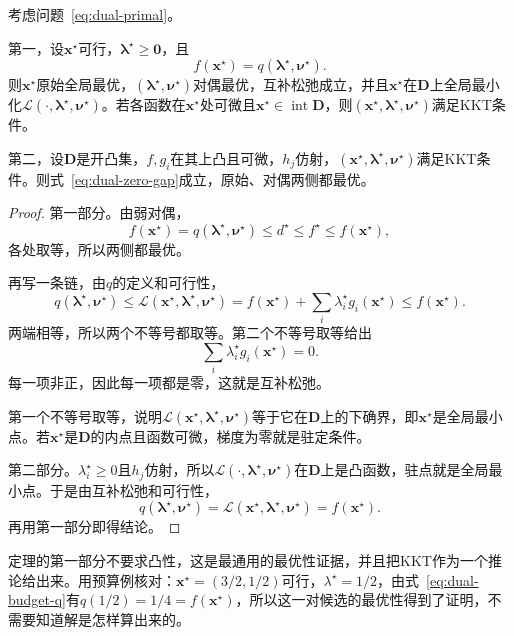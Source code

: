 \begin{theorem}[零间隙与KKT]
 \label{thm:dual-zero-gap-kkt}
 考虑问题~\eqref{eq:dual-primal}。

 第一，设$\bm{x}^\star$可行，$\bm{\lambda}^\star\geq\bm{0}$，且
 \begin{equation}
  f(\bm{x}^\star)=q(\bm{\lambda}^\star,\bm{\nu}^\star).
  \label{eq:dual-zero-gap}
 \end{equation}
 则$\bm{x}^\star$原始全局最优，$(\bm{\lambda}^\star,\bm{\nu}^\star)$对偶最优，互补松弛成立，并且$\bm{x}^\star$在$\bm{D}$上全局最小化$\mathcal{L}(\cdot,\bm{\lambda}^\star,\bm{\nu}^\star)$。若各函数在$\bm{x}^\star$处可微且$\bm{x}^\star\in\operatorname{int}\bm{D}$，则$(\bm{x}^\star,\bm{\lambda}^\star,\bm{\nu}^\star)$满足KKT条件。

 第二，设$\bm{D}$是开凸集，$f,g_i$在其上凸且可微，$h_j$仿射，$(\bm{x}^\star,\bm{\lambda}^\star,\bm{\nu}^\star)$满足KKT条件。则式~\eqref{eq:dual-zero-gap}成立，原始、对偶两侧都最优。
\end{theorem}

\begin{proof}
 第一部分。由弱对偶，
 \[
  f(\bm{x}^\star)=q(\bm{\lambda}^\star,\bm{\nu}^\star)\leq d^\star\leq f^\star\leq f(\bm{x}^\star),
 \]
 各处取等，所以两侧都最优。

 再写一条链，由$q$的定义和可行性，
 \[
  q(\bm{\lambda}^\star,\bm{\nu}^\star)\leq\mathcal{L}(\bm{x}^\star,\bm{\lambda}^\star,\bm{\nu}^\star)=f(\bm{x}^\star)+\sum_i\lambda_i^\star g_i(\bm{x}^\star)\leq f(\bm{x}^\star).
 \]
 两端相等，所以两个不等号都取等。第二个不等号取等给出
 \[
  \sum_i\lambda_i^\star g_i(\bm{x}^\star)=0.
 \]
 每一项非正，因此每一项都是零，这就是互补松弛。

 第一个不等号取等，说明$\mathcal{L}(\bm{x}^\star,\bm{\lambda}^\star,\bm{\nu}^\star)$等于它在$\bm{D}$上的下确界，即$\bm{x}^\star$是全局最小点。若$\bm{x}^\star$是$\bm{D}$的内点且函数可微，梯度为零就是驻定条件。

 第二部分。$\lambda_i^\star\geq0$且$h_j$仿射，所以$\mathcal{L}(\cdot,\bm{\lambda}^\star,\bm{\nu}^\star)$在$\bm{D}$上是凸函数，驻点就是全局最小点。于是由互补松弛和可行性，
 \[
  q(\bm{\lambda}^\star,\bm{\nu}^\star)=\mathcal{L}(\bm{x}^\star,\bm{\lambda}^\star,\bm{\nu}^\star)=f(\bm{x}^\star).
 \]
 再用第一部分即得结论。
\end{proof}

定理的第一部分不要求凸性，这是最通用的最优性证据，并且把KKT作为一个推论给出来。用预算例核对：$\bm{x}^\star=(3/2,1/2)$可行，$\lambda^\star=1/2$，由式~\eqref{eq:dual-budget-q}有$q(1/2)=1/4=f(\bm{x}^\star)$，所以这一对候选的最优性得到了证明，不需要知道解是怎样算出来的。

